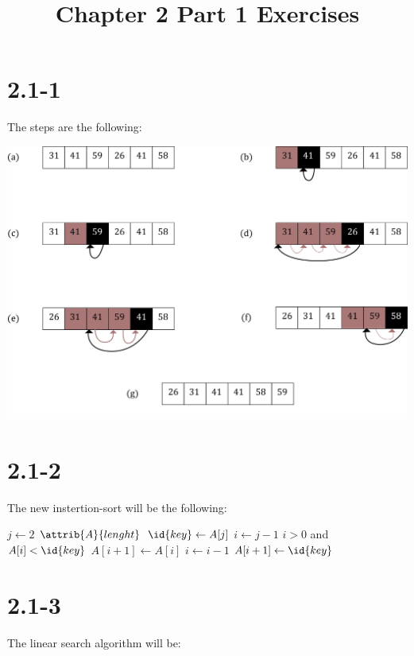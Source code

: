 \documentclass{article}
\title{Chapter 2 Part 1 Exercises}
\begin{document}
\date{}
\author{}

\maketitle

\section*{2.1-1}

The steps are the following:

\includegraphics[scale=0.3]{2_1-1.png}

\section*{2.1-2}

The new instertion-sort will be the following:

\begin{codebox}
    \li \For $j \gets 2$ \To $\attrib{A}{lenght}$
    \li   \Do            
          $\id{key} \gets A[j]$
    \li   $i \gets j-1$
    \li   \While $i > 0$ and $A[i] < \id{key}$
    \li     \Do
            $A[i+1] \gets A[i]$
    \li     $i \gets i-1$
            \End
    \li   $A[i+1] \gets\id{key}$
          \End
\end{codebox}

\section*{2.1-3}

The linear search algorithm will be:
\end{document}

